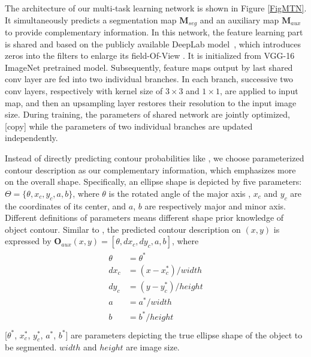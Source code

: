 The architecture of our multi-task learning network is shown in Figure \ref{FigMTN}.
It simultaneously predicts a segmentation map $\mathbf{M}_{seg}$ and an auxiliary map $\mathbf{M}_{aux}$ to provide complementary information.
% 
In this network, the feature learning part is shared and based on the publicly available DeepLab model~\cite{Chen2014a}, which introduces zeros into the filters to enlarge its field-Of-View .
%
It is initialized from VGG-16 ImageNet pretrained model.
Subsequently, feature maps output by last shared conv layer are fed into two individual branches.
In each branch, successive two conv layers, respectively with kernel size of $3\times3$ and $1\times1$, are applied to input map, and then an upsampling layer restores their resolution to the input image size.
During training, the parameters of shared network are jointly optimized, [copy] while the parameters of two individual branches are updated independently.

Instead of directly predicting contour probabilities like \cite{Chen2016a,Xu2016}, we choose parameterized contour description as our complementary information, which emphasizes more on the overall shape.
%
Specifically, an ellipse shape is depicted by five parameters: $\Theta = \{\theta, x_c, y_c, a, b\}$, where $\theta$ is the rotated angle of the major axis , $x_c$ and $y_c$ are the coordinates of its center, and $a$, $b$ are respectively  major and minor axis.
%
Different definitions of parameters means different shape prior knowledge of object contour.
Similar to \cite{Redmon2016}, the predicted contour description on $(x,y)$ is expressed by $\mathbf{O}_{aux}(x,y) = [\theta, dx_c, dy_c, a, b]$, 
where
\begin{eqnarray}\label{EqMax}
\begin{aligned}
\theta &= \theta^*\\
dx_c &= (x-x_c^*)/width\\
dy_c &= (y-y_c^*)/height\\
a &= a^*/width\\
b &= b^*/height\\
\end{aligned}
\end{eqnarray}
[$\theta^*$, $x_c^*$, $y_c^*$, $a^*$, $b^*$] are parameters depicting the true ellipse shape of the object to be segmented.
$width$ and $height$ are image size.


